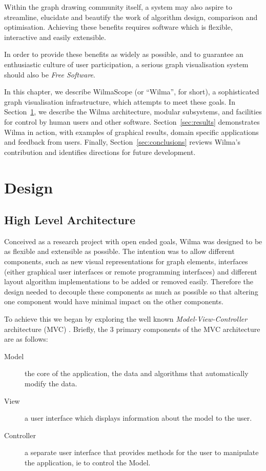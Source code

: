 \documentclass[runningheads]{cl2emult}
\begin{document}
Within the graph drawing community itself, a system may also aspire to 
streamline, elucidate and beautify the work of algorithm design, comparison
and optimisation.  Achieving these benefits requires software which is
flexible, interactive and easily extensible.

In order to provide these benefits as widely as possible, and to guarantee
an enthusiastic culture of user participation, a serious graph visualisation
system should also be {\em Free Software}\cite{stallman92why}.

In this chapter, we describe WilmaScope (or ``Wilma'', for short), a
sophisticated graph visualisation infrastructure, which attempts to meet
these goals.  In Section~\ref{sec:design}, we describe the Wilma
architecture, modular subsystems, and facilities for control by human users
and other software.  Section~\ref{sec:results} demonstrates Wilma in
action, with examples of graphical results, domain specific applications and
feedback from users.  Finally, Section~\ref{sec:conclusions} reviews Wilma's
contribution and identifies directions for future development.

\section{Design}\label{sec:design}
\subsection{High Level Architecture}
Conceived as a research project with open ended goals, Wilma was
designed to be as flexible and extensible as possible.  The intention
was to allow different components, such as new visual representations
for graph elements, interfaces (either graphical user interfaces or
remote programming interfaces) and different 
layout algorithm implementations to be added or removed easily.
Therefore the design needed to decouple these components as much as
possible so that altering one component would have minimal impact on
the other components.

To achieve this we began by exploring the well known {\em Model-View-Controller}
architecture (MVC) \cite{gamma94design}.  Briefly, the 3 primary components of the MVC architecture are as follows:
\begin{description}
\item[Model] the core
of the application, the data and algorithms that automatically modify
the data. 
\item[View] a user interface which displays information
about the model to the user. 
\item[Controller] a separate user
interface that provides methods for the user to manipulate the
application, ie to control the Model.  
\end{description}
\end{document}
